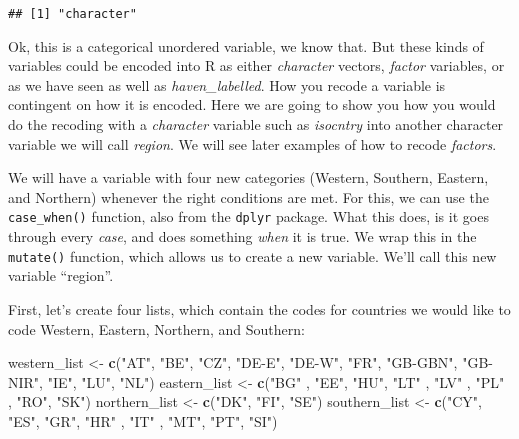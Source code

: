 \documentclass[
]{book}
\newenvironment{Shaded}{\begin{snugshade}}{\end{snugshade}}
\newcommand{\FunctionTok}[1]{\textcolor[rgb]{0.13,0.29,0.53}{\textbf{#1}}}
\newcommand{\NormalTok}[1]{#1}
\newcommand{\OtherTok}[1]{\textcolor[rgb]{0.56,0.35,0.01}{#1}}
\newcommand{\StringTok}[1]{\textcolor[rgb]{0.31,0.60,0.02}{#1}}
\begin{document}
\begin{verbatim}
## [1] "character"
\end{verbatim}

Ok, this is a categorical unordered variable, we know that. But these kinds of variables could be encoded into R as either \emph{character} vectors, \emph{factor} variables, or as we have seen as well as \emph{haven\_labelled}. How you recode a variable is contingent on how it is encoded. Here we are going to show you how you would do the recoding with a \emph{character} variable such as \emph{isocntry} into another character variable we will call \emph{region}. We will see later examples of how to recode \emph{factors}.

We will have a variable with four new categories (Western, Southern, Eastern, and Northern) whenever the right conditions are met. For this, we can use the \texttt{case\_when()} function, also from the \texttt{dplyr} package. What this does, is it goes through every \emph{case}, and does something \emph{when} it is true. We wrap this in the \texttt{mutate()} function, which allows us to create a new variable. We'll call this new variable ``region''.

First, let's create four lists, which contain the codes for countries we would like to code Western, Eastern, Northern, and Southern:

\begin{Shaded}
\begin{Highlighting}[]
\NormalTok{western\_list }\OtherTok{\textless{}{-}} \FunctionTok{c}\NormalTok{(}\StringTok{"AT"}\NormalTok{, }\StringTok{"BE"}\NormalTok{, }\StringTok{"CZ"}\NormalTok{, }\StringTok{"DE{-}E"}\NormalTok{, }\StringTok{"DE{-}W"}\NormalTok{, }
                  \StringTok{"FR"}\NormalTok{, }\StringTok{"GB{-}GBN"}\NormalTok{, }\StringTok{"GB{-}NIR"}\NormalTok{, }\StringTok{"IE"}\NormalTok{, }\StringTok{"LU"}\NormalTok{, }\StringTok{"NL"}\NormalTok{)}
\NormalTok{eastern\_list }\OtherTok{\textless{}{-}} \FunctionTok{c}\NormalTok{(}\StringTok{"BG"}\NormalTok{ , }\StringTok{"EE"}\NormalTok{, }\StringTok{"HU"}\NormalTok{, }\StringTok{"LT"}\NormalTok{ , }\StringTok{"LV"}\NormalTok{ , }\StringTok{"PL"}\NormalTok{ , }\StringTok{"RO"}\NormalTok{, }\StringTok{"SK"}\NormalTok{)}
\NormalTok{northern\_list }\OtherTok{\textless{}{-}} \FunctionTok{c}\NormalTok{(}\StringTok{"DK"}\NormalTok{, }\StringTok{"FI"}\NormalTok{, }\StringTok{"SE"}\NormalTok{)}
\NormalTok{southern\_list }\OtherTok{\textless{}{-}} \FunctionTok{c}\NormalTok{(}\StringTok{"CY"}\NormalTok{, }\StringTok{"ES"}\NormalTok{, }\StringTok{"GR"}\NormalTok{, }\StringTok{"HR"}\NormalTok{ , }\StringTok{"IT"}\NormalTok{ , }\StringTok{"MT"}\NormalTok{, }\StringTok{"PT"}\NormalTok{, }\StringTok{"SI"}\NormalTok{)}
\end{Highlighting}
\end{Shaded}
\end{document}
